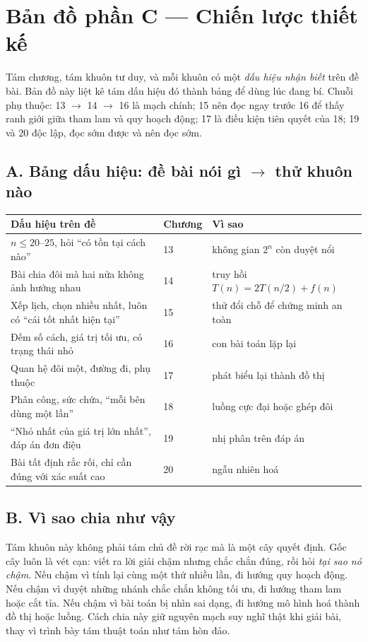 \documentclass[../algorithm.tex]{subfiles}
\begin{document}
\section*{Bản đồ phần C --- Chiến lược thiết kế}

\begin{tomtat}
Tám chương, tám khuôn tư duy, và mỗi khuôn có một \emph{dấu hiệu nhận biết} trên đề bài. Bản đồ này liệt kê tám dấu hiệu đó thành bảng để dùng lúc đang bí. Chuỗi phụ thuộc: 13 \(\rightarrow\) 14 \(\rightarrow\) 16 là mạch chính; 15 nên đọc ngay trước 16 để thấy ranh giới giữa tham lam và quy hoạch động; 17 là điều kiện tiên quyết của 18; 19 và 20 độc lập, đọc sớm được và nên đọc sớm.
\end{tomtat}

\subsection*{A. Bảng dấu hiệu: đề bài nói gì \(\rightarrow\) thử khuôn nào}
\begin{center}\footnotesize
\begin{tabularx}{\linewidth}{@{}L{5.6cm}L{2.2cm}Y@{}}
\toprule
\textbf{Dấu hiệu trên đề} & \textbf{Chương} & \textbf{Vì sao}\\
\midrule
\(n \le 20\text{--}25\), hỏi ``có tồn tại cách nào'' & 13 & không gian \(2^n\) còn duyệt nổi\\
Bài chia đôi mà hai nửa không ảnh hưởng nhau & 14 & truy hồi \(T(n)=2T(n/2)+f(n)\)\\
Xếp lịch, chọn nhiều nhất, luôn có ``cái tốt nhất hiện tại'' & 15 & thử đổi chỗ để chứng minh an toàn\\
Đếm số cách, giá trị tối ưu, có trạng thái nhỏ & 16 & con bài toán lặp lại\\
Quan hệ đôi một, đường đi, phụ thuộc & 17 & phát biểu lại thành đồ thị\\
Phân công, sức chứa, ``mỗi bên dùng một lần'' & 18 & luồng cực đại hoặc ghép đôi\\
``Nhỏ nhất của giá trị lớn nhất'', đáp án đơn điệu & 19 & nhị phân trên đáp án\\
Bài tất định rắc rối, chỉ cần đúng với xác suất cao & 20 & ngẫu nhiên hoá\\
\bottomrule
\end{tabularx}
\end{center}

\subsection*{B. Vì sao chia như vậy}
Tám khuôn này không phải tám chủ đề rời rạc mà là một cây quyết định. Gốc cây luôn là vét cạn: viết ra lời giải chậm nhưng chắc chắn đúng, rồi hỏi \emph{tại sao nó chậm}. Nếu chậm vì tính lại cùng một thứ nhiều lần, đi hướng quy hoạch động. Nếu chậm vì duyệt những nhánh chắc chắn không tối ưu, đi hướng tham lam hoặc cắt tỉa. Nếu chậm vì bài toán bị nhìn sai dạng, đi hướng mô hình hoá thành đồ thị hoặc luồng. Cách chia này giữ nguyên mạch suy nghĩ thật khi giải bài, thay vì trình bày tám thuật toán như tám hòn đảo.
\end{document}

